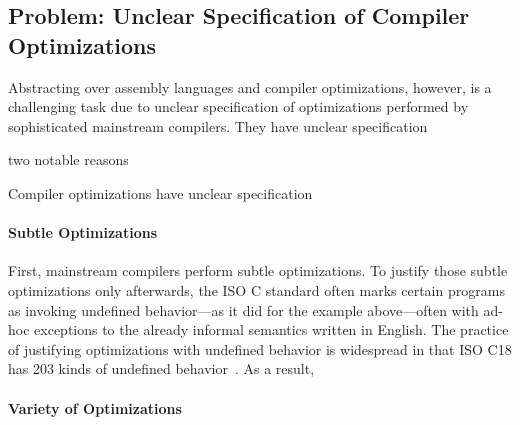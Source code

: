 






\subsection{Problem: Unclear Specification of Compiler Optimizations}
\label{sec:introduction:problem}

Abstracting over assembly languages and compiler optimizations, however, is a challenging task due
to unclear specification of optimizations performed by sophisticated mainstream compilers.  They
have unclear specification


 two notable reasons


Compiler
optimizations have unclear specification 

\paragraph{Subtle Optimizations}

First, mainstream compilers perform subtle optimizations.  To justify those subtle optimizations
only afterwards, the ISO C standard often marks certain programs as invoking undefined behavior---as
it did for the example above---often with ad-hoc exceptions to the already informal semantics
written in English.  The practice of justifying optimizations with undefined behavior is widespread
in that ISO C18 has 203 kinds of undefined behavior~\cite[J.2]{c18}.  As a result,


\paragraph{Variety of Optimizations}

